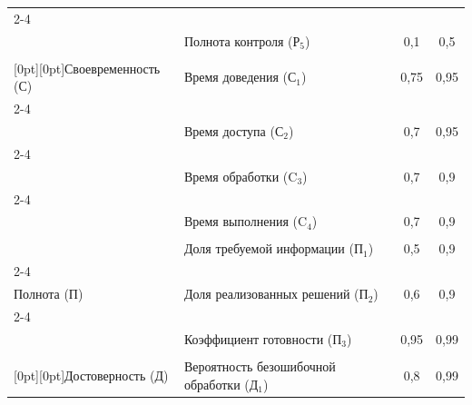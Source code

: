 \begin{table}[b]
\begin{center}
\begin{tabular}{|l|l|c|c|}
\cline{2-4}

&&&\\[-9pt]

&Полнота контроля (Р$_5$)&0,1\hphantom{9}&0,5\hphantom{9}\\

\hline

&&&\\[-9pt]

\multicolumn{1}{|l|}{\raisebox{-16pt}[0pt][0pt]{Своевременность (С)}}&Время доведения (С$_1$)    &0,75&0,95\\

\cline{2-4}

&&&\\[-9pt]

&Время доступа (С$_2$)&0,7\hphantom{9}&0,95\\

\cline{2-4}

&&&\\[-9pt]

&Время обработки (C$_3$)&0,7\hphantom{9}&0,9\hphantom{9}\\

\cline{2-4}

&&&\\[-9pt]

&Время выполнения (C$_4$)&0,7\hphantom{9}&0,9\hphantom{9}\\

\hline

&&&\\[-9pt]

&Доля требуемой информации (П$_1$)&0,5\hphantom{9}&0,9\hphantom{9}\\

\cline{2-4}

&&&\\[-9pt]

Полнота (П)&Доля реализованных решений (П$_2$)&0,6\hphantom{9}&0,9\hphantom{9}\\

\cline{2-4}

&&&\\[-9pt]

&Коэффициент готовности (П$_3$)&0,95&0,99\\

\hline

&&&\\[-9pt]

\multicolumn{1}{|l|}{\raisebox{-16pt}[0pt][0pt]{Достоверность (Д)}}&Вероятность безошибочной обработки (Д$_1$)&0,8\hphantom{9}&0,99\\


\end{tabular}
\end{center}
\end{table}
